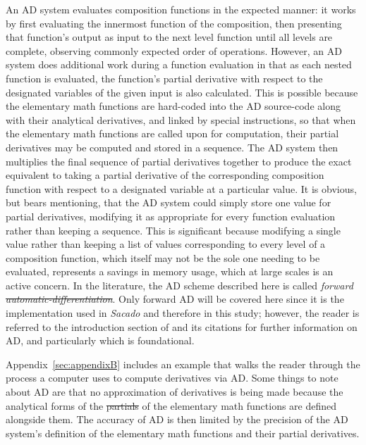\documentclass[preprint,12pt]{elsarticle}
\providecommand{\DIFaddtex}[1]{{\protect\color{blue}\uwave{#1}}} %
\providecommand{\DIFdeltex}[1]{{\protect\color{red}\sout{#1}}}                      %
\providecommand{\DIFaddbegin}{} %
\providecommand{\DIFaddend}{} %
\providecommand{\DIFdelbegin}{} %
\providecommand{\DIFdelend}{} %
\providecommand{\DIFadd}[1]{\texorpdfstring{\DIFaddtex{#1}}{#1}} %
\providecommand{\DIFdel}[1]{\texorpdfstring{\DIFdeltex{#1}}{}} %
\begin{document}
An AD system evaluates composition functions in the expected manner: it works by first evaluating the innermost function of the composition, then presenting that function's output as input to the next level function until all levels are complete, observing commonly expected order of operations. However, an AD system does additional work during a function evaluation in that as each nested function is evaluated, the function's partial derivative with respect to the designated variables of the given input is also calculated.  This is possible because the elementary math functions are hard-coded into the AD source-code along with their analytical derivatives, and linked by special instructions, so that when the elementary math functions are called upon for computation, their partial derivatives may be computed and stored in a sequence. The AD system then multiplies the final sequence of partial derivatives together to produce the exact equivalent to taking a partial derivative of the corresponding composition function with respect to a designated variable at a particular value. 
It is obvious, but bears mentioning, that the AD system could simply store one value for partial derivatives, modifying it as appropriate for every function evaluation rather than keeping a sequence. This is significant because modifying a single value rather than keeping a list of values corresponding to every level of a composition function, which itself may not be the sole one needing to be evaluated, represents a savings in memory usage, which at large scales is an active concern. In the literature, the AD scheme described here is called \emph{forward \DIFdelbegin \DIFdel{automatic-differentiation}\DIFdelend \DIFaddbegin \DIFadd{automatic differentiation}\DIFaddend }. Only forward AD will be covered here since it is the implementation used in \emph{Sacado} and therefore in this study; however, the reader is referred to the introduction section of \cite{ref-AD-methods} and its citations for further information on AD, and
particularly \cite{ref-on-AD} which is foundational.
\DIFaddbegin 

\DIFaddend Appendix~\ref{sec:appendixB} includes an example that walks the reader through the process a computer uses to compute derivatives via AD.  Some things to note about AD are that no approximation of derivatives is being made because the analytical forms of the \DIFdelbegin \DIFdel{partials }\DIFdelend \DIFaddbegin \DIFadd{partial derivatives }\DIFaddend of the elementary math functions are defined alongside them. The accuracy of AD is then limited by the precision of the AD system's definition of the elementary math functions and their partial derivatives.
\end{document}
